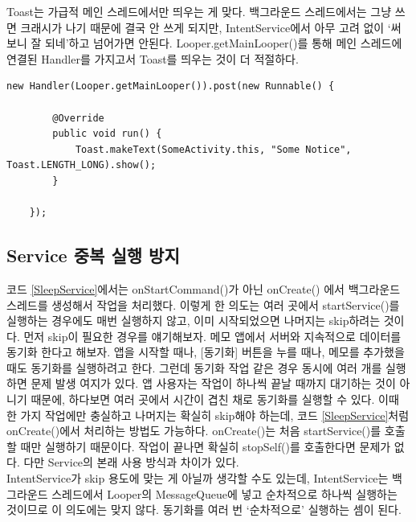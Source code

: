 Toast는 가급적 메인 스레드에서만 띄우는 게 맞다. 
백그라운드 스레드에서는 그냥 쓰면 크래시가 나기 때문에 결국 안 쓰게 되지만, IntentService에서 아무 고려 없이 `써보니 잘 되네'하고 넘어가면 안된다. 
Looper.getMainLooper()를 통해 메인 스레드에 연결된 Handler를 가지고서 Toast를 띄우는 것이 더 적절하다.
\begin{lstlisting}[frame=single]
	new Handler(Looper.getMainLooper()).post(new Runnable() {
	
		@Override
		public void run() {
			Toast.makeText(SomeActivity.this, "Some Notice", Toast.LENGTH_LONG).show();
		}
		
	});
\end{lstlisting}

\subsection{Service 중복 실행 방지}
코드 \ref{SleepService}에서는 onStartCommand()가 아닌 onCreate() 에서 백그라운드 스레드를 생성해서 작업을 처리했다. 
이렇게 한 의도는 여러 곳에서 startService()를 실행하는 경우에도 매번 실행하지 않고, 이미 시작되었으면 나머지는 skip하려는 것이다.
먼저 skip이 필요한 경우를 얘기해보자. 
메모 앱에서 서버와 지속적으로 데이터를 동기화 한다고 해보자. 앱을 시작할 때나, [동기화] 버튼을 누를 때나, 메모를 추가했을 때도 동기화를 실행하려고 한다. 
그런데 동기화 작업 같은 경우 동시에 여러 개를 실행하면 문제 발생 여지가 있다. 
앱 사용자는 작업이 하나씩 끝날 때까지 대기하는 것이 아니기 때문에, 하다보면 여러 곳에서 시간이 겹친 채로 동기화를 실행할 수 있다.
이때 한 가지 작업에만 충실하고 나머지는 확실히 skip해야 하는데, 코드 \ref{SleepService}처럼 onCreate()에서 처리하는 방법도 가능하다. 
onCreate()는 처음 startService()를 호출할 때만 실행하기 때문이다. 
작업이 끝나면 확실히 stopSelf()를 호출한다면 문제가 없다. 다만 Service의 본래 사용 방식과 차이가 있다.\\

IntentService가 skip 용도에 맞는 게 아닐까 생각할 수도 있는데, 
IntentService는 백그라운드 스레드에서 Looper의 MessageQueue에 넣고 순차적으로 하나씩 실행하는 것이므로 이 의도에는 맞지 않다. 동기화를 여러 번 `순차적으로' 실행하는 셈이 된다.\\


